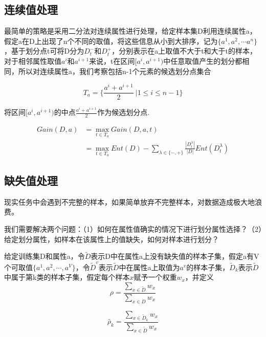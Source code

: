 \documentclass[UTF8]{article}
\begin{document}
\subsection{连续值处理}
最简单的策略是采用二分法对连续属性进行处理，给定样本集D利用连续属性a，假定a在D上出现了n个不同的取值，将这些信息从小到大排序，记为$\{ a^1, a^2, \cdots a^n \}$，基于划分点t可将D分为$D_{t}^{-}$和$D_{t}^{+}$，分别表示在a上取值不大于t和大于t的样本，对于相邻属性取值$a^i$和$a^{i+1}$来说，t在区间$[a^i , a^{i+1})$中任意取值产生的划分都相同，所以对连续属性a，我们考察包括n-1个元素的候选划分点集合

\begin{equation}
T_a = \{ \frac{a^i + a^{i+1}}{2}\  | 1 \leq i \leq n-1 \}
\end{equation}

将区间$[a^i , a^{i+1})$的中点$\frac{a^i + a^{i+1}}{2}$作为候选划分点.

\begin{equation}
  \begin{split}
  Gain(D, a) &= \mathop{\max}_{t \in T_a} Gain(D, a, t) \\
  &= \mathop{\max}_{t \in T_a} Ent(D) - \sum_{\lambda \in \{-, + \}} \frac{| D_{t}^{\lambda} |}{|D|} Ent(D_{t}^{\lambda})
  \end{split}
\end{equation}

\subsection{缺失值处理}
现实任务中会遇到不完整的样本，如果简单放弃不完整样本，对数据造成极大地浪费。

我们需要解决两个问题：（1）如何在属性值确实的情况下进行划分属性选择？（2）给定划分属性，如样本在该属性上的值缺失，如何对样本进行划分？

给定训练集D和属性a，令$\tilde{D}$表示D中在属性a上没有缺失值的样本子集，假定a有V个可取值$\{ a^1, a^2, \cdots, a^V \}$，令$\tilde{D}^v$表示$\tilde{D}$中在属性a上取值为$a^v$的样本子集，$\tilde{D}_k$表示$\tilde{D}$中属于第k类的样本子集，假定每个样本$x$赋予一个权重$w_x$，并定义
\begin{equation}
  \rho = \frac{\sum_{x \in \tilde{D}}w_x}{\sum_{x \in D}w_x}
\end{equation}

\begin{equation}
  \tilde{\rho_k} = \frac{\sum_{x \in \tilde{D}_k}w_x}{\sum_{x \in \tilde{D}}w_x}
\end{equation}
\end{document}
